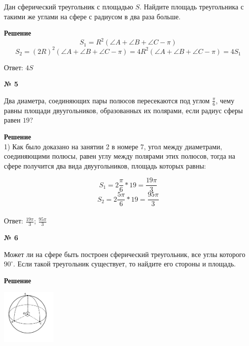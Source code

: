     Дан сферический треугольник с площадью $S$.
    Найдите площадь треугольника с такими же углами на сфере с радиусом в два раза больше.

    \textbf{Решение}\\

    \[
        S_1 = R^2(\angle A + \angle B + \angle C - \pi)
    \]
    \[
        S_2 = (2R)^2(\angle A + \angle B + \angle C - \pi) = 4R^2(\angle A + \angle B + \angle C - \pi) = 4S_1
    \]

    Ответ: $4S$

    \begin{center}
        \textbf{№ 5}
    \end{center}

    Два диаметра, соединяющих пары полюсов пересекаются под углом $\frac{\pi}{6}$,
    чему равны площади двуугольников, образованных их полярами, если радиус сферы равен $19$?

    \textbf{Решение}\\

    1) Как было доказано на занятии 2 в номере 7, угол между диаметрами, соединяющими полюсы,
    равен углу между полярами этих полюсов, тогда на сфере получится два вида двуугольников,
    площадь которых равны:

    \[
        S_1 = 2\frac{\pi}{6} * 19 = \frac{19\pi}{3}
    \]
    \[
        S_2 = 2\frac{5\pi}{6} * 19 = \frac{95\pi}{3}
    \]\\

    Ответ: $\frac{19\pi}{3}$; $\frac{95\pi}{3}$

    \begin{center}
        \textbf{№ 6}
    \end{center}

    Может ли на сфере быть построен сферический треугольник, все углы которого $90^\circ$.
    Если такой треугольник существует, то найдите его стороны и площадь.

    \textbf{Решение}\\

    \begin{center}
        \includegraphics[width=0.2\textwidth]{images/img6}\\
    \end{center}

